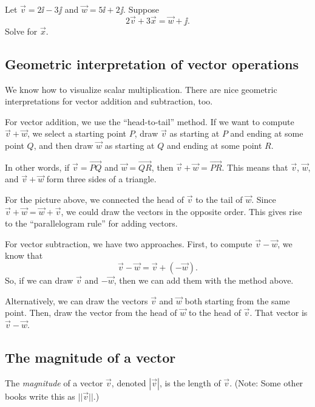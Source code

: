 \begin{ex}
    Let $\vec{v}=2\ii -3\jj $ and $\vec{w}=5\ii +2\jj $.
    Suppose 
    \[
        2\vec{v}+3\vec{x}=\vec{w}+\jj .
    \]
    Solve for $\vec{x}$.
\end{ex}

\pagebreak 

\subsection{Geometric interpretation of vector operations}
We know how to visualize scalar multiplication. There are nice geometric interpretations for vector addition and subtraction, too.

For vector addition, we use the ``head-to-tail'' method. If we want to compute $\vec{v}+\vec{w}$, we select a starting point $P$, draw $\vec{v}$ as starting at $P$ and ending at some point $Q$, and then draw $\vec{w}$ as starting at $Q$ and ending at some point $R$. 

\vspace{2in}

In other words, if $\vec{v}=\vec{PQ}$ and $\vec{w}=\vec{QR}$, then $\vec{v}+\vec{w}=\vec{PR}$. This means that $\vec{v}$, $\vec{w}$, and $\vec{v}+\vec{w}$ form three sides of a triangle.

For the picture above, we connected the head of $\vec{v}$ to the tail of $\vec{w}$. Since $\vec{v}+\vec{w}=\vec{w}+\vec{v}$, we could draw the vectors in the opposite order. This gives rise to the ``parallelogram rule'' for adding vectors.

\vspace{2in}

For vector subtraction, we have two approaches. First, to compute $\vec{v}-\vec{w}$, we know that
\[
    \vec{v}-\vec{w}=\vec{v}+(-\vec{w}).
\]
So, if we can draw $\vec{v}$ and $-\vec{w}$, then we can add them with the method above.

Alternatively, we can draw the vectors $\vec{v}$ and $\vec{w}$ both starting from the same point. Then, draw the vector from the head of $\vec{w}$ to the head of $\vec{v}$. That vector is $\vec{v}-\vec{w}$.

\vspace{2in}

\pagebreak 

\subsection{The magnitude of a vector}
\begin{defn}[Magnitude]
    The \emph{magnitude} of a vector $\vec{v}$, denoted $|\vec{v}|$, is the length of $\vec{v}$. (Note: Some other books write this as $||\vec{v}||$.)
\end{defn}

